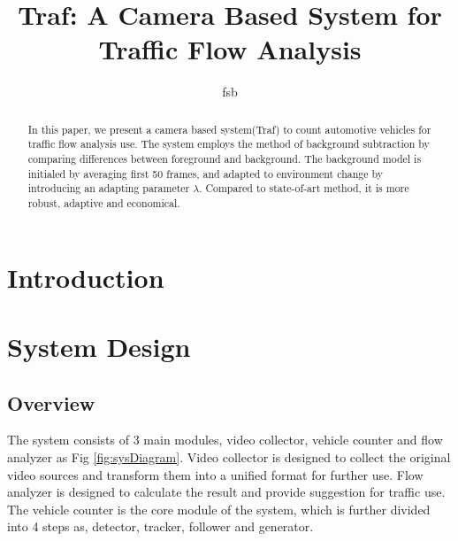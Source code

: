 \documentclass[draftclsnofoot,onecolumn]{IEEEtran}
\begin{document}
\title{Traf: A Camera Based System for Traffic Flow Analysis}
\maketitle
\author{fsb}

\begin{abstract}

In this paper, we present a camera based system(Traf) to count automotive vehicles for traffic flow analysis use. The system employs the method of background subtraction by comparing differences between foreground and background. The background model is initialed by averaging first 50 frames, and adapted to environment change by introducing an adapting parameter $\lambda$. Compared to state-of-art method, it is more robust, adaptive and economical.

\end{abstract}


\section{Introduction}


\section{System Design}
	\subsection{Overview}
	The system consists of 3 main modules, video collector, vehicle counter and flow analyzer as Fig \ref{fig:sysDiagram}. Video collector is designed to collect the original video sources and transform them into a unified format for further use. Flow analyzer is designed to calculate the result and provide suggestion for traffic use. The vehicle counter is the core module of the system, which is further divided into 4 steps as, detector, tracker, follower and generator. 
	
\end{document}
